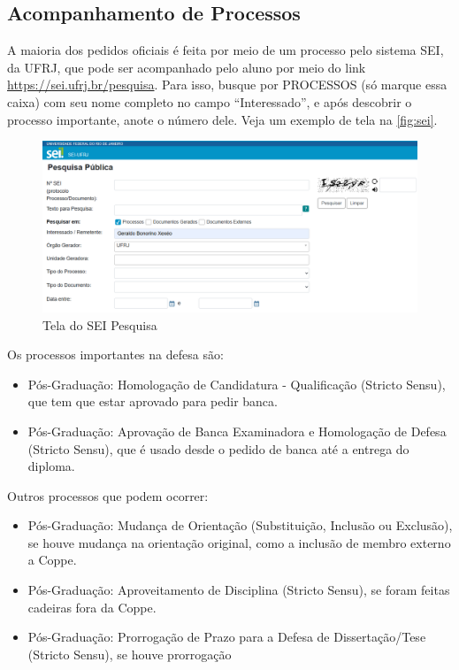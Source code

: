 \documentclass[a4paper,12pt]{article}
\begin{document}
\subsection{Acompanhamento de Processos}

A maioria dos pedidos oficiais é feita por meio de um processo pelo sistema SEI, da UFRJ, que pode ser acompanhado pelo aluno por meio do link \url{https://sei.ufrj.br/pesquisa}. Para isso, busque por PROCESSOS (só marque essa caixa) com seu nome completo no campo ``Interessado'', e após descobrir o processo importante, anote o número dele. Veja um exemplo de tela na \autoref{fig:sei}.

\begin{figure}[hbt]
    \centering
    \includegraphics[width=\linewidth]{SEIpesquisa.png}
    \caption{Tela do SEI Pesquisa}
    \label{fig:sei}
\end{figure}

Os processos importantes na defesa são:
\begin{itemize}
    \item Pós-Graduação: Homologação de Candidatura - Qualificação (Stricto Sensu), que tem que estar aprovado para pedir banca.
    \item Pós-Graduação: Aprovação de Banca Examinadora e Homologação de Defesa (Stricto Sensu), que é usado desde o pedido de banca até a entrega do diploma.

\end{itemize}

Outros processos que podem ocorrer:
\begin{itemize}
    \item Pós-Graduação: Mudança de Orientação (Substituição, Inclusão ou Exclusão), se houve mudança na orientação original, como a inclusão de membro externo a Coppe.
    \item Pós-Graduação: Aproveitamento de Disciplina (Stricto Sensu), se foram feitas cadeiras fora da Coppe. 
        \item Pós-Graduação: Prorrogação de Prazo para a Defesa de Dissertação/Tese (Stricto Sensu), se houve prorrogação
\end{itemize}
\end{document}
